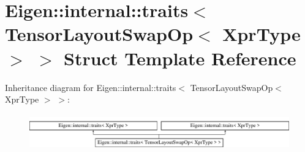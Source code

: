 \hypertarget{struct_eigen_1_1internal_1_1traits_3_01_tensor_layout_swap_op_3_01_xpr_type_01_4_01_4}{}\section{Eigen\+:\+:internal\+:\+:traits$<$ Tensor\+Layout\+Swap\+Op$<$ Xpr\+Type $>$ $>$ Struct Template Reference}
\label{struct_eigen_1_1internal_1_1traits_3_01_tensor_layout_swap_op_3_01_xpr_type_01_4_01_4}
Inheritance diagram for Eigen\+:\+:internal\+:\+:traits$<$ Tensor\+Layout\+Swap\+Op$<$ Xpr\+Type $>$ $>$\+:\begin{figure}[H]
\begin{center}
\leavevmode
\includegraphics[height=1.577465cm]{struct_eigen_1_1internal_1_1traits_3_01_tensor_layout_swap_op_3_01_xpr_type_01_4_01_4}
\end{center}
\end{figure}
